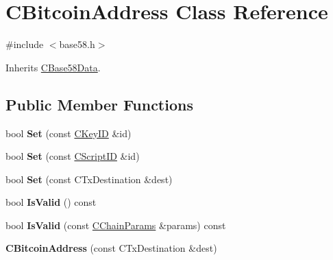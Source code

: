 \hypertarget{class_c_bitcoin_address}{}\section{C\+Bitcoin\+Address Class Reference}
\label{class_c_bitcoin_address}


{\ttfamily \#include $<$base58.\+h$>$}



Inherits \mbox{\hyperlink{class_c_base58_data}{C\+Base58\+Data}}.

\subsection*{Public Member Functions}
\begin{DoxyCompactItemize}
\item 
\mbox{\label{class_c_bitcoin_address_abe1614f9ecd143ae69256d65c5edbcab}} 
bool {\bfseries Set} (const \mbox{\hyperlink{class_c_key_i_d}{C\+Key\+ID}} \&id)
\item 
\mbox{\label{class_c_bitcoin_address_abb974c40304444b0f14a005ddb7dac03}} 
bool {\bfseries Set} (const \mbox{\hyperlink{class_c_script_i_d}{C\+Script\+ID}} \&id)
\item 
\mbox{\label{class_c_bitcoin_address_a819dfc6a4866832e2cd2e51c1a245d80}} 
bool {\bfseries Set} (const C\+Tx\+Destination \&dest)
\item 
\mbox{\label{class_c_bitcoin_address_ab39907ce6895062a8f8bf585270ef13b}} 
bool {\bfseries Is\+Valid} () const
\item 
\mbox{\label{class_c_bitcoin_address_a0c6030891dae71881944f93774fa907e}} 
bool {\bfseries Is\+Valid} (const \mbox{\hyperlink{class_c_chain_params}{C\+Chain\+Params}} \&params) const
\item 
\mbox{\label{class_c_bitcoin_address_a4c9c03791561557b8a1926567456712e}} 
{\bfseries C\+Bitcoin\+Address} (const C\+Tx\+Destination \&dest)
\item 
\mbox{\label{class_c_bitcoin_address_a23f7116fe3a89ab9a551f1d8c29469da}} 

\end{DoxyCompactItemize}
